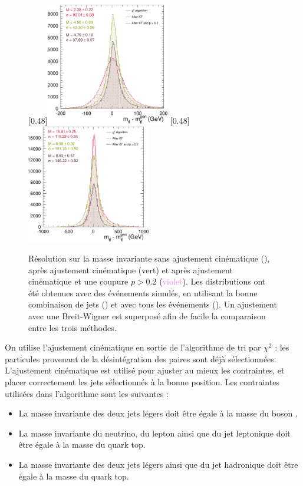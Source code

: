 \begin{figure}[p] \centering
    \subcaptionbox{\label{fig:kinfit_matched_events}}[0.48\textwidth]{\includegraphics[width=0.48\textwidth]{chapitre6/figs/kinfit/mtt_resolution_comparison_kf_good_solutions.pdf}} \hfill
    \subcaptionbox{\label{fig:kinfit_all_events}}[0.48\textwidth]{\includegraphics[width=0.48\textwidth]{chapitre6/figs/kinfit/mtt_resolution_comparison_kf_all_events.pdf}}
    \caption{Résolution sur la masse invariante \mtt sans ajustement cinématique (\rouge), après ajustement cinématique (\textcolor{vert}{vert}) et après ajustement cinématique et une coupure $p > \num{0.2}$ (\textcolor{violet}{violet}). Les distributions ont été obtenues avec des événements \ttbar simulés, en utilisant la bonne combinaison de jets () et avec tous les événements (). Un ajustement avec une Breit-Wigner est superposé afin de facile la comparaison entre les trois méthodes.}
    \label{fig:kinfit_ttbar}
\end{figure}

On utilise l'ajustement cinématique en sortie de l'algorithme de tri par $\chi^2$ : les particules provenant de la désintégration des paires \ttbar sont déjà sélectionnées. L'ajustement cinématique est utilisé pour ajuster au mieux les contraintes, et placer correctement les jets sélectionnés à la bonne position. Les contraintes utilisées dans l'algorithme sont les suivantes :
\begin{itemize}
    \item La masse invariante des deux jets légers doit être égale à la masse du boson \PW.
    \item La masse invariante du neutrino, du lepton ainsi que du jet \Pbottom leptonique doit être égale à la masse du quark top.
    \item La masse invariante des deux jets légers ainsi que du jet \Pbottom hadronique doit être égale à la masse du quark top.
\end{itemize}

